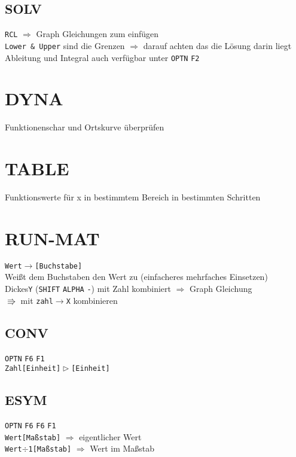 \documentclass[12pt,a4paper]{article}
\def\g#1{\texttt{#1}}
\begin{document}
	\subsection{SOLV}
	 \g{RCL} $\Rightarrow$ Graph Gleichungen zum einfügen\\
	 \g{Lower \& Upper} sind die Grenzen $\Rightarrow$ darauf achten das die Lösung darin liegt\\
	 Ableitung und Integral auch verfügbar unter \g{OPTN} \g{F2}
	 
	 
	 
	 \section{DYNA}
	 Funktionenschar und Ortskurve \"uberpr\"ufen
	 
	 
	 
	 \section{TABLE}
	 Funktionswerte für x in bestimmtem Bereich in bestimmten Schritten
	 
	 
	 
	 \section{RUN-MAT}
	 \g{Wert$\rightarrow$[Buchstabe]}\\
	 Weißt dem Buchstaben den Wert zu (einfacheres mehrfaches Einsetzen)\\
	 \glqq Dickes\grqq \space \g{Y} (\g{SHIFT} \g{ALPHA} \g{-}) mit Zahl kombiniert $\Rightarrow$ Graph Gleichung\\
	 $ \Rrightarrow $ mit \g{zahl$\rightarrow$X} kombinieren\\
	 
	 \subsection{CONV}
	 \g{OPTN} \g{F6} \g{F1}\\
	 \g{Zahl[Einheit]$ \vartriangleright $[Einheit]}
	 
	 \subsection{ESYM}
	 \g{OPTN} \g{F6} \g{F6} \g{F1}\\
	 \g{Wert[Maßstab]} $ \Rightarrow $ eigentlicher Wert\\
	 \g{Wert$\div$1[Maßstab]} $ \Rightarrow $ Wert im Maßstab
	 
\end{document}
